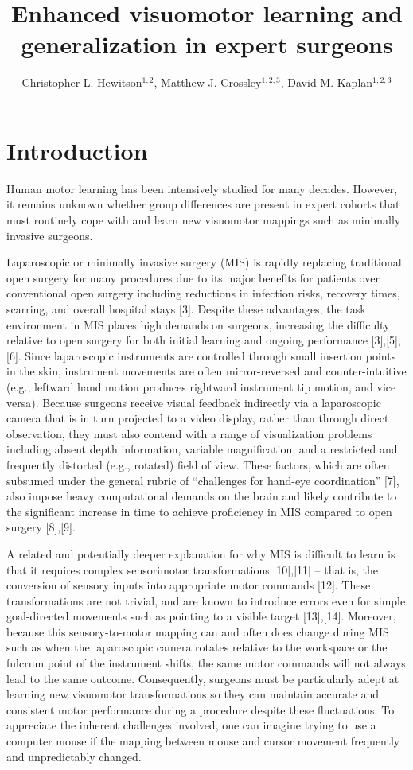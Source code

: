 \documentclass[jou, apacite, 11pt, longtable, floatsintext, notab]{apa6}
\title{\textbf{Enhanced visuomotor learning and
    generalization in expert surgeons}}
\author{Christopher L. Hewitson$^{1,2}$, Matthew J.
  Crossley$^{1,2,3}$, David M. Kaplan$^{1,2,3}$}
\affiliation{
  $^1$Macquarie University \\
  $^2$Perception in Action Research Centre \\
  $^3$Centre for Elite Performance, Expertise \& Training}
\begin{document}
\maketitle

\section{Introduction}
Human motor learning has been intensively studied for many
decades\cite{shadmehr_2010, krakauer_2011}. However, it
remains unknown whether group differences are present in
expert cohorts that must routinely cope with and learn new
visuomotor mappings such as minimally invasive surgeons.

Laparoscopic or minimally invasive surgery (MIS) is rapidly
replacing traditional open surgery for many procedures due
to its major benefits for patients over conventional open
surgery including reductions in infection risks, recovery
times, scarring, and overall hospital stays
[3].
Despite
these advantages, the task environment in MIS places high
demands on surgeons, increasing the difficulty relative to
open surgery for both initial learning \cite{braga_2002} and
ongoing performance
[3],[5],[6].
Since laparoscopic
instruments are controlled through small insertion points in
the skin, instrument movements are often mirror-reversed and
counter-intuitive (e.g., leftward hand motion produces
rightward instrument tip motion, and vice versa). Because
surgeons receive visual feedback indirectly via a
laparoscopic camera that is in turn projected to a video
display, rather than through direct observation, they must
also contend with a range of visualization problems
including absent depth information, variable magnification,
and a restricted and frequently distorted (e.g., rotated)
field of view. These factors, which are often subsumed under
the general rubric of ``challenges for hand-eye
coordination''
[7],
also impose heavy computational demands
on the brain and likely contribute to the significant
increase in time to achieve proficiency in MIS compared to
open surgery
[8],[9].

A related and potentially deeper explanation for why MIS is
difficult to learn is that it requires complex sensorimotor
transformations
[10],[11]
-- that is, the conversion of
sensory inputs into appropriate motor commands
[12].
These
transformations are not trivial, and are known to introduce
errors even for simple goal-directed movements such as
pointing to a visible target
[13],[14].
Moreover, because
this sensory-to-motor mapping can and often does change
during MIS such as when the laparoscopic camera rotates
relative to the workspace or the fulcrum point of the
instrument shifts, the same motor commands will not always
lead to the same outcome. Consequently, surgeons must be
particularly adept at learning new visuomotor
transformations so they can maintain accurate and consistent
motor performance during a procedure despite these
fluctuations. To appreciate the inherent challenges
involved, one can imagine trying to use a computer mouse if
the mapping between mouse and cursor movement frequently and
unpredictably changed.
\end{document}
